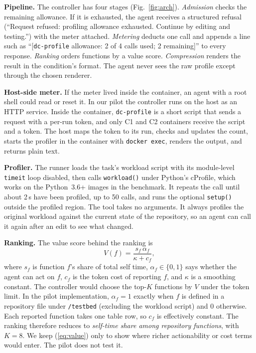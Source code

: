 \documentclass[conference]{IEEEtran}
\newcommand{\tool}{\texttt{dc-profile}}
\begin{document}
\textbf{Pipeline.} The controller has four stages (Fig.~\ref{fig:arch}).
\emph{Admission} checks the remaining allowance. If it is exhausted, the agent
receives a structured refusal (``Request refused: profiling allowance
exhausted. Continue by editing and testing.'') with the meter attached.
\emph{Metering} deducts one call and appends a line such as
``[\tool{} allowance: 2 of 4 calls used; 2 remaining]'' to every response.
\emph{Ranking} orders functions by a value score. \emph{Compression} renders
the result in the condition's format. The agent never sees the raw profile
except through the chosen renderer.

\textbf{Host-side meter.} If the meter lived inside the container, an agent
with a root shell could read or reset it. In our pilot the controller runs on
the host as an HTTP service. Inside the container, \tool{} is a short script
that sends a request with a per-run token, and only C1 and C2 containers
receive the script and a token. The host maps the token to its run, checks
and updates the count, starts the profiler in the container with
\texttt{docker exec}, renders the output, and returns plain text.

\textbf{Profiler.} The runner loads the task's workload script with its
module-level \texttt{timeit} loop disabled, then calls \texttt{workload()}
under Python's cProfile, which works on the Python~3.6+ images in the
benchmark. It repeats the call until about 2\,s have been profiled, up to 50
calls, and runs the optional \texttt{setup()} outside the profiled region. The
tool takes no arguments. It always profiles the original workload against the
current state of the repository, so an agent can call it again after an edit
to see what changed.

\textbf{Ranking.} The value score behind the ranking is
\begin{equation}
V(f) = \frac{s_f\,\alpha_f}{\kappa + c_f},
\label{eq:value}
\end{equation}
where $s_f$ is function $f$'s share of total self time, $\alpha_f\in\{0,1\}$
says whether the agent can act on $f$, $c_f$ is the token cost of reporting
$f$, and $\kappa$ is a smoothing constant. The controller would choose the
top-$K$ functions by $V$ under the token limit. In the pilot implementation,
$\alpha_f=1$ exactly when $f$ is defined in a repository file under
\texttt{/testbed} (excluding the workload script) and $0$ otherwise. Each
reported function takes one table row, so $c_f$ is effectively constant. The
ranking therefore reduces to \emph{self-time share among repository
functions}, with $K=8$. We keep (\ref{eq:value}) only to show where richer
actionability or cost terms would enter. The pilot does not test it.
\end{document}
